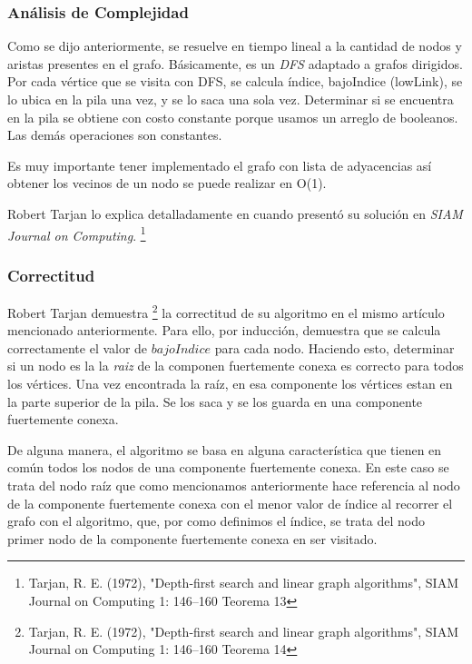 
\subsubsection{Análisis de Complejidad}

\quad Como se dijo anteriormente, se resuelve en tiempo lineal a la cantidad de nodos y aristas presentes en el grafo. Básicamente, es un \textit{DFS} adaptado a grafos dirigidos. Por cada vértice que se visita con DFS, se calcula índice, bajoIndice (lowLink), se lo ubica en la pila una vez, y se lo saca una sola vez. Determinar si se encuentra en la pila se obtiene con costo constante porque usamos un arreglo de booleanos. Las demás operaciones son constantes.

\quad Es muy importante tener implementado el grafo con lista de adyacencias así obtener los vecinos de un nodo se puede realizar en O(1).

\quad

\quad Robert Tarjan lo explica detalladamente en cuando presentó su solución en \textit{SIAM Journal on Computing}. \footnote{ Tarjan, R. E. (1972), "Depth-first search and linear graph algorithms", SIAM Journal on Computing 1: 146–160 Teorema 13}

\subsubsection{Correctitud}

\quad Robert Tarjan demuestra \footnote{ Tarjan, R. E. (1972), "Depth-first search and linear graph algorithms", SIAM Journal on Computing 1: 146–160 Teorema 14} la correctitud de su algoritmo en el mismo artículo mencionado anteriormente. Para ello, por inducción, demuestra que se calcula correctamente el valor de $ bajoIndice $ para cada nodo. Haciendo esto, determinar si un nodo es la la \textit{raiz} de la componen fuertemente conexa es correcto para todos los vértices. Una vez encontrada la raíz, en esa componente los vértices estan en la parte superior de la pila. Se los saca y se los guarda en una componente fuertemente conexa.

\quad De alguna manera, el algoritmo se basa en alguna característica que tienen en común todos los nodos de una componente fuertemente conexa. En este caso se trata del nodo raíz que como mencionamos anteriormente hace referencia al nodo de la componente fuertemente conexa con el menor valor de índice al recorrer el grafo con el algoritmo, que, por como definimos el índice, se trata del nodo primer nodo de la componente fuertemente conexa en ser visitado. 

